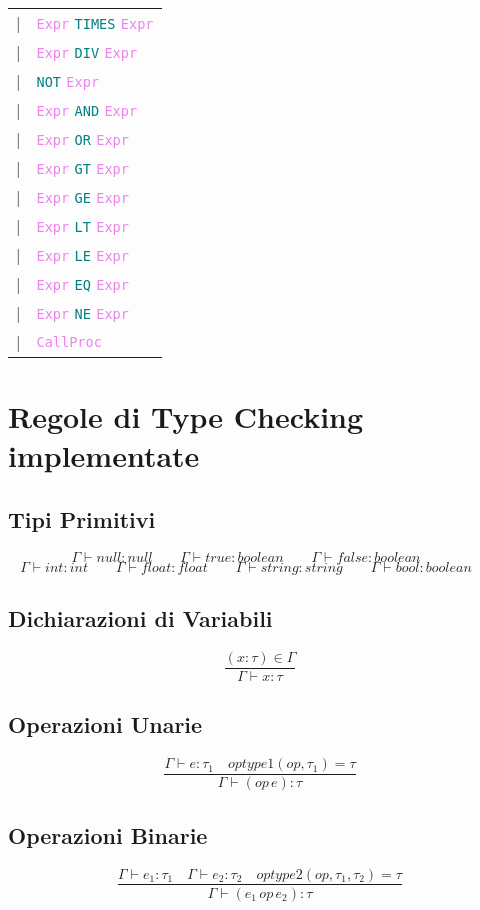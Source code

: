 \documentclass[a4paper,12pt]{article}
\newcommand\mi[1]{\mathit{#1}}
\newcommand\nonterm[1]{\texttt{\textcolor{violet}{#1}}}
\newcommand\term[1]{\texttt{\textcolor{teal}{#1}}}
\begin{document}
\begin{tabular}{rl}
						|& \nonterm{Expr} \term{TIMES} \nonterm{Expr} \\
						|& \nonterm{Expr} \term{DIV} \nonterm{Expr} \\
    						|& \term{NOT} \nonterm{Expr} \\
						|& \nonterm{Expr} \term{AND} \nonterm{Expr} \\
						|& \nonterm{Expr} \term{OR} \nonterm{Expr} \\
						|& \nonterm{Expr} \term{GT} \nonterm{Expr} \\
						|& \nonterm{Expr} \term{GE} \nonterm{Expr} \\
						|& \nonterm{Expr} \term{LT} \nonterm{Expr} \\
						|& \nonterm{Expr} \term{LE} \nonterm{Expr} \\
						|& \nonterm{Expr} \term{EQ} \nonterm{Expr} \\
						|& \nonterm{Expr} \term{NE} \nonterm{Expr} \\
						|& \nonterm{CallProc} \\
    \end{tabular}
    \section{Regole di Type Checking implementate}
    \subsection{Tipi Primitivi}
    \[
        \Gamma \vdash null \colon null \qquad
        \Gamma \vdash true \colon boolean \qquad
        \Gamma \vdash false \colon boolean \qquad
    \]
    \[
        \Gamma \vdash \mi{int} \colon int \qquad
        \Gamma \vdash \mi{float} \colon float \qquad
        \Gamma \vdash \mi{string} \colon string \qquad
        \Gamma \vdash \mi{bool}    \colon boolean \qquad
    \]
    \subsection{Dichiarazioni di Variabili}
    \[
        \frac{(x \colon \tau) \in \Gamma}{\Gamma \vdash x \colon \tau}
    \]
    \subsection{Operazioni Unarie}
    \[
        \frac {\Gamma \vdash \mi{e} \colon \tau_1 \quad optype1(op,\tau_1) = \tau} %
              {\Gamma \vdash (op \, \mi{e}) \colon \tau}
    \]
    \subsection{Operazioni Binarie}
    \[
        \frac {\Gamma \vdash \mi{e_1} \colon \tau_1 \quad \Gamma \vdash \mi{e_2} \colon \tau_2  \quad optype2(op,\tau_1, \tau_2) = \tau} %
        {\Gamma \vdash (\mi{e_1}\, op \, \mi{e_2}) \colon \tau}
    \]
\end{document}
